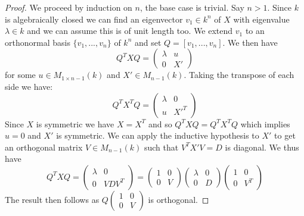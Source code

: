 \documentclass[12pt]{article}
\theoremstyle{plain}
\theoremstyle{definition}
\begin{document}
\begin{proof}
We proceed by induction on $n$, the base case is trivial. Say $n > 1$. Since $k$ is algebraically closed we can find an eigenvector $v_1 \in k^n$ of $X$ with eigenvalue $\lambda \in k$ and we can assume this is of unit length too. We extend $v_1$ to an orthonormal basis $\lbrace v_1,...,v_n\rbrace$ of $k^n$ and set $Q = [v_1,...,v_n]$. We then have
\[Q^TXQ = \begin{pmatrix}
\lambda & u\\
0 & X'
\end{pmatrix}\]
for some $u \in M_{1 \times n-1}(k)$ and $X' \in M_{n-1}(k)$. Taking the transpose of each side we have:
\[Q^TX^TQ = \begin{pmatrix}
\lambda & 0\\
u & X'^T
\end{pmatrix} \]
Since $X$ is symmetric we have $X = X^T$ and so $Q^TXQ = Q^TX^TQ$ which implies $u = 0$ and $X'$ is symmetric. We can apply the inductive hypothesis to $X'$ to get an orthogonal matrix $V \in M_{n-1}(k)$ such that $V^TX'V = D$ is diagonal. We thus have
\[Q^TXQ = \begin{pmatrix}
\lambda & 0\\
0 & VDV^T
\end{pmatrix} = \begin{pmatrix}
1 & 0\\
0 & V
\end{pmatrix}\begin{pmatrix}
\lambda & 0\\
0 & D
\end{pmatrix}\begin{pmatrix}
1 & 0\\
0 & V^T
\end{pmatrix}\]The result then follows as $Q\begin{pmatrix}
1 & 0\\
0 & V
\end{pmatrix}$ is orthogonal.
\end{proof}
\end{document}

